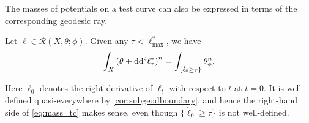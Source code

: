 The masses of potentials on a test curve can also be expressed in terms of the corresponding geodesic ray.
\begin{proposition}[Hisamoto]\label{prop:His_mass_tc}
        Let $\ell\in \mathcal{R}(X,\theta;\phi)$. Given any $\tau<\ell^*_{\max}$, we have
    \begin{equation}\label{eq:mass_tc}
    \int_X \left(\theta+\mathrm{dd}^{\mathrm{c}} \ell^*_{\tau}\right)^n=\int_{\{\dot{\ell}_0\geq \tau\}} \theta_{\phi}^n.
    \end{equation}
\end{proposition}
Here $\dot{\ell}_0$ denotes the right-derivative of $\ell_t$ with respect to $t$ at $t=0$. It is well-defined quasi-everywhere by \cref{cor:subgeodboundary}, and hence the right-hand side of \eqref{eq:mass_tc} makes sense, even though $\{\dot{\ell}_0\geq \tau\}$ is not well-defined.


